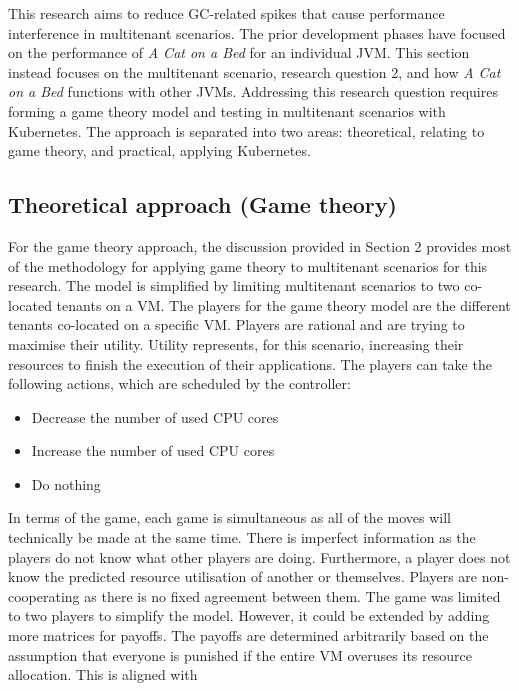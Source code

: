 This research aims to reduce GC-related spikes that cause
performance interference in multitenant scenarios. The prior development
phases have focused on the performance of \emph{A Cat on a Bed} for an
individual JVM. This section instead focuses on the multitenant
scenario, research question 2, and how \emph{A Cat on a Bed} functions with
other JVMs. Addressing this research question requires forming a game
theory model and testing in multitenant scenarios with Kubernetes. The
approach is separated into two areas: theoretical, relating to game
theory, and practical, applying Kubernetes.
\subsection{Theoretical approach (Game theory)}
For the game theory approach, the discussion provided in Section 2
provides most of the methodology for applying game theory to multitenant
scenarios for this research. The model is simplified by limiting
multitenant scenarios to two co-located tenants on a VM.
\newline\newline
The players for the game theory model are the different tenants
co-located on a specific VM. Players are rational and are trying to
maximise their utility. Utility represents, for this scenario,
increasing their resources to finish the execution of their
applications. The players can take the following actions, which are
scheduled by the controller:
\begin{itemize}
\item
  Decrease the number of used CPU cores
\item
 Increase the number of used CPU cores
\item
  Do nothing
\end{itemize}
In terms of the game, each game is simultaneous as all of the moves
will technically be made at the same time. There is imperfect
information as the players do not know what other players are doing.
Furthermore, a player does not know the predicted resource utilisation
of another or themselves. Players are non-cooperating as there is no
fixed agreement between them.
\newline\newline
The game was limited to two players to simplify the model. However,
it could be extended by adding more matrices for payoffs. The payoffs are
determined arbitrarily based on the assumption that everyone is punished
if the entire VM overuses its resource allocation. This is aligned with
